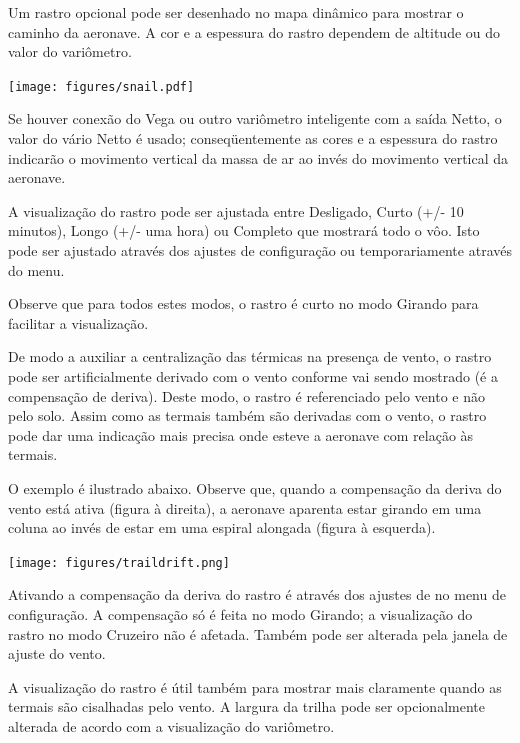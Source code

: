 Um rastro opcional pode ser desenhado no mapa dinâmico para mostrar o caminho da aeronave.  A cor e a espessura do rastro dependem de altitude ou do valor do variômetro.


\begin{center}
\texttt{[image: figures/snail.pdf]}
\end{center}

Se houver conexão do Vega ou outro variômetro inteligente com a saída Netto, o valor do vário Netto é usado; conseqüentemente as cores e a espessura do rastro indicarão o movimento vertical da massa de ar ao invés do movimento vertical da aeronave.

A visualização do rastro pode ser ajustada entre Desligado, Curto (+/- 10 minutos), Longo (+/- uma hora) ou Completo que mostrará todo o vôo.  Isto pode ser ajustado através dos ajustes de configuração ou temporariamente através do menu.

Observe que para todos estes modos, o rastro é curto no modo Girando para facilitar a visualização.

De modo a auxiliar a centralização das térmicas na presença de vento, o rastro pode ser artificialmente derivado com o vento conforme vai sendo mostrado (é a compensação de deriva).  Deste modo, o rastro é referenciado pelo vento e não pelo solo.  Assim como as termais também são derivadas com o vento, o rastro pode dar uma indicação mais precisa onde esteve a aeronave com relação às termais.

O exemplo é ilustrado abaixo.  Observe que, quando a compensação da deriva do vento está ativa (figura à direita), a aeronave aparenta estar girando em uma coluna ao invés de estar em uma espiral alongada (figura à esquerda).

\begin{center}
\texttt{[image: figures/traildrift.png]}
\end{center}

Ativando a compensação da deriva do rastro é através dos ajustes de no menu de configuração. A compensação só é feita no modo Girando; a visualização do rastro no modo Cruzeiro não é afetada.  Também pode ser alterada pela janela de ajuste do vento.

A visualização do rastro é útil também para mostrar mais claramente quando as termais são cisalhadas pelo vento.
A largura da trilha pode ser opcionalmente alterada de acordo com a visualização do variômetro.  


